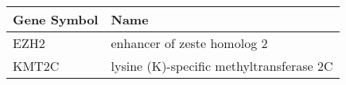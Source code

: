 \begin{tabular}{ll}
\toprule
Gene Symbol &                                     Name \\
\midrule
       EZH2 &              enhancer of zeste homolog 2 \\
      KMT2C & lysine (K)-specific methyltransferase 2C \\
\bottomrule
\end{tabular}
